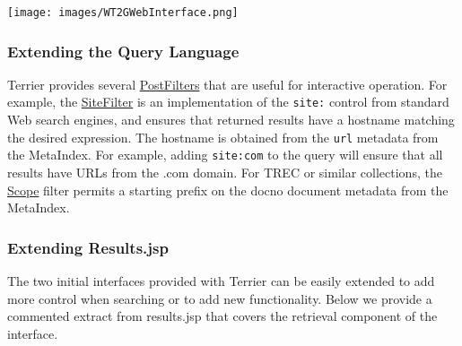 \texttt{[image: images/WT2GWebInterface.png]}

\subsubsection{Extending the Query
Language}\label{extending-the-query-language}

Terrier provides several
\href{javadoc/org/terrier/querying/PostFilter.html}{PostFilters} that
are useful for interactive operation. For example, the
\href{javadoc/org/terrier/querying/SiteFilter.html}{SiteFilter} is an
implementation of the \texttt{site:} control from standard Web search
engines, and ensures that returned results have a hostname matching the
desired expression. The hostname is obtained from the \texttt{url}
metadata from the MetaIndex. For example, adding \texttt{site:com} to
the query will ensure that all results have URLs from the .com domain.
For TREC or similar collections, the
\href{javadoc/org/terrier/querying/Scope.html}{Scope} filter permits a
starting prefix on the docno document metadata from the MetaIndex.

\subsubsection{Extending Results.jsp}\label{extending-results.jsp}

The two initial interfaces provided with Terrier can be easily extended
to add more control when searching or to add new functionality. Below we
provide a commented extract from results.jsp that covers the retrieval
component of the interface.

